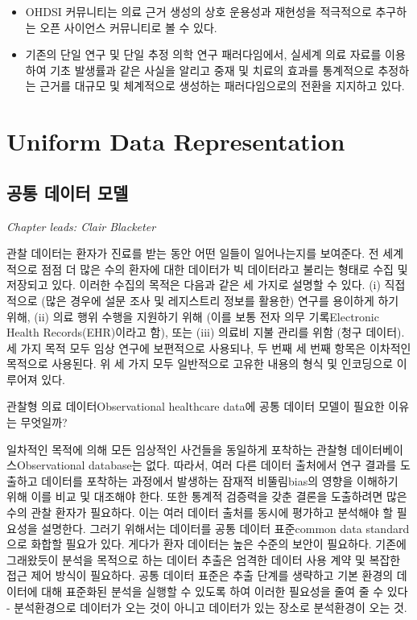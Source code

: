 \documentclass[11pt]{book}
\theoremstyle{definition}
\theoremstyle{definition}
\theoremstyle{definition}
\theoremstyle{remark}
\let\BeginKnitrBlock\begin \let\EndKnitrBlock\end
\begin{document}
\BeginKnitrBlock{rmdsummary}
\begin{itemize}
\item
  OHDSI 커뮤니티는 의료 근거 생성의 상호 운용성과 재현성을 적극적으로
  추구하는 오픈 사이언스 커뮤니티로 볼 수 있다.
\item
  기존의 단일 연구 및 단일 추정 의학 연구 패러다임에서, 실세계 의료
  자료를 이용하여 기초 발생률과 같은 사실을 알리고 중재 및 치료의 효과를
  통계적으로 추정하는 근거를 대규모 및 체계적으로 생성하는
  패러다임으로의 전환을 지지하고 있다.
\end{itemize}
\EndKnitrBlock{rmdsummary}

\part{Uniform Data
Representation}\label{part-uniform-data-representation}

\chapter{공통 데이터 모델}\label{CommonDataModel}

\emph{Chapter leads: Clair Blacketer}

관찰 데이터는 환자가 진료를 받는 동안 어떤 일들이 일어나는지를 보여준다.
전 세계적으로 점점 더 많은 수의 환자에 대한 데이터가 빅 데이터라고
불리는 형태로 수집 및 저장되고 있다. 이러한 수집의 목적은 다음과 같은 세
가지로 설명할 수 있다. (i) 직접적으로 (많은 경우에 설문 조사 및
레지스트리 정보를 활용한) 연구를 용이하게 하기 위해, (ii) 의료 행위
수행을 지원하기 위해 (이를 보통 전자 의무 기록Electronic Health
Records(EHR)이라고 함), 또는 (iii) 의료비 지불 관리를 위함 (청구
데이터). 세 가지 목적 모두 임상 연구에 보편적으로 사용되나, 두 번째 세
번째 항목은 이차적인 목적으로 사용된다. 위 세 가지 모두 일반적으로
고유한 내용의 형식 및 인코딩으로 이루어져 있다.
 

관찰형 의료 데이터Observational healthcare data에 공통 데이터 모델이
필요한 이유는 무엇일까?

일차적인 목적에 의해 모든 임상적인 사건들을 동일하게 포착하는 관찰형
데이터베이스Observational database는 없다. 따라서, 여러 다른 데이터
출처에서 연구 결과를 도출하고 데이터를 포착하는 과정에서 발생하는 잠재적
비뚤림bias의 영향을 이해하기 위해 이를 비교 및 대조해야 한다. 또한
통계적 검증력을 갖춘 결론을 도출하려면 많은 수의 관찰 환자가 필요하다.
이는 여러 데이터 출처를 동시에 평가하고 분석해야 할 필요성을 설명한다.
그러기 위해서는 데이터를 공통 데이터 표준common data standard으로 화합할
필요가 있다. 게다가 환자 데이터는 높은 수준의 보안이 필요하다. 기존에
그래왔듯이 분석을 목적으로 하는 데이터 추출은 엄격한 데이터 사용 계약 및
복잡한 접근 제어 방식이 필요하다. 공통 데이터 표준은 추출 단계를
생략하고 기본 환경의 데이터에 대해 표준화된 분석을 실행할 수 있도록 하여
이러한 필요성을 줄여 줄 수 있다 - 분석환경으로 데이터가 오는 것이 아니고
데이터가 있는 장소로 분석환경이 오는 것.
\end{document}
